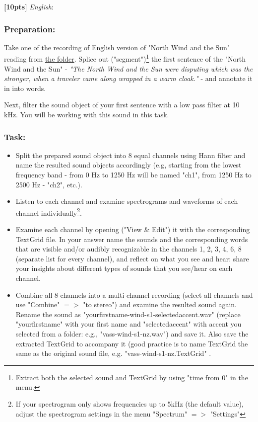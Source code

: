 \documentclass{../labbook}
\begin{document}
\begin{problem}{1}
\textbf{[10pts]} \textit{English}: 

\subsubsection*{Preparation:}

Take one of the recording of English version of "North Wind and the Sun" reading from \href{https://drive.google.com/drive/folders/16kZBQhEbdeE40Rv_GGGD-JhZfa5eA1fu?usp=sharing}{the folder}. Splice out ("segment")\footnote{Extract both the selected sound and TextGrid by using "time from 0" in the menu.} the first sentence of the "North Wind and the Sun" - \textit{"The North Wind and the Sun were disputing which was the stronger, when a traveler came along wrapped in a warm cloak."} - and annotate it in into words. 

Next, filter the sound object of your first sentence with a low pass filter at 10 kHz. You will be working with this sound in this task.

\subsubsection*{Task:}
\begin{itemize}
    \item Split the prepared sound object into 8 equal channels using Hann filter and name the resulted sound objects accordingly (e.g, starting from the lowest frequency band - from 0 Hz to 1250 Hz will be named "ch1", from 1250 Hz to 2500 Hz - "ch2", etc.).
    \item Listen to each channel and examine spectrograms and waveforms of each channel individually\footnote{If your spectrogram only shows frequencies up to 5kHz (the default value), adjust the spectrogram settings in the menu "Spectrum" $=>$ "Settings"}.
    \item Examine each channel by opening ("View \& Edit") it with the corresponding TextGrid file. In your answer name the sounds and the corresponding words that are visible and/or audibly recognizable in the channels 1, 2, 3, 4, 6, 8 (separate list for every channel), and reflect on what you see and hear: share your insights about different types of sounds that you see/hear on each channel.
    \item Combine all 8 channels into a multi-channel recording (select all channels and use "Combine" $=>$ "to stereo") and examine the resulted sound again. Rename the sound as "yourfirstname-wind-s1-selectedaccent.wav" (replace "yourfirstname" with your first name and "selectedaccent" with accent you selected from a folder: e.g., "vass-wind-s1-nz.wav") and save it. Also save the extracted TextGrid to accompany it (good practice is to name TextGrid the same as the original sound file, e.g. "vass-wind-s1-nz.TextGrid" .
\end{itemize}

\end{problem}
\end{document}
